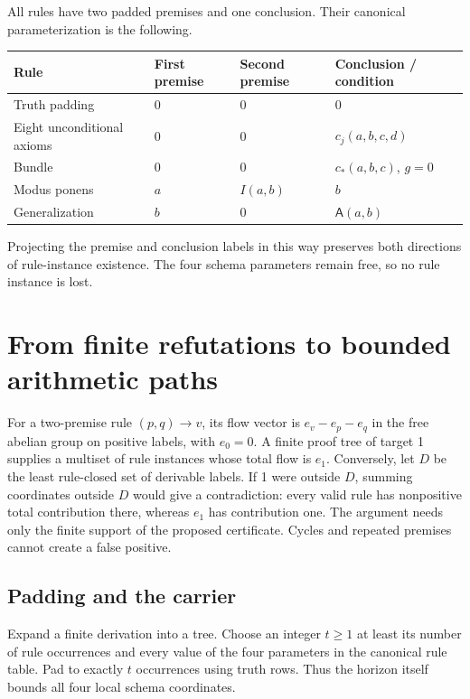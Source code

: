 \documentclass[10pt,letterpaper]{article}
\theoremstyle{definition}\newtheorem{definition}[theorem]{Definition}
\theoremstyle{remark}\newtheorem{remark}[theorem]{Remark}
\begin{document}
All rules have two padded premises and one conclusion. Their canonical
parameterization is the following.
\begin{center}\small
\begin{tabular}{llll}
\toprule
Rule & First premise & Second premise & Conclusion / condition\\
\midrule
Truth padding & 0 & 0 & 0\\
Eight unconditional axioms & 0 & 0 & $c_j(a,b,c,d)$\\
Bundle & 0 & 0 & $c_*(a,b,c)$, $g=0$\\
Modus ponens & $a$ & $I(a,b)$ & $b$\\
Generalization & $b$ & 0 & $\mathsf A(a,b)$\\
\bottomrule
\end{tabular}
\end{center}
Projecting the premise and conclusion labels in this way preserves both
directions of rule-instance existence. The four schema parameters remain
free, so no rule instance is lost.

\section{From finite refutations to bounded arithmetic paths}
\label{sec:flow}

For a two-premise rule $(p,q)\to v$, its flow vector is
$e_v-e_p-e_q$ in the free abelian group on positive labels, with $e_0=0$.
A finite proof tree of target 1 supplies a multiset of rule instances
whose total flow is $e_1$. Conversely, let $D$ be the least rule-closed set
of derivable labels. If 1 were outside $D$, summing coordinates outside
$D$ would give a contradiction: every valid rule has nonpositive total
contribution there, whereas $e_1$ has contribution one. The argument needs
only the finite support of the proposed certificate. Cycles and repeated
premises cannot create a false positive.

\subsection{Padding and the carrier}

Expand a finite derivation into a tree. Choose an integer $t\ge1$ at least
its number of rule occurrences and every value of the four parameters in
the canonical rule table. Pad to exactly $t$ occurrences using truth rows.
Thus the horizon itself bounds all four local schema coordinates.
\end{document}
